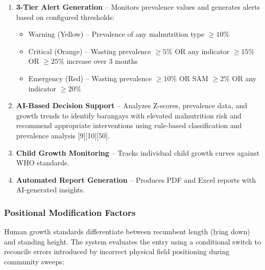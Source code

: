 \documentclass[12pt, a4paper]{report}
\begin{document}
\begin{enumerate}
    \item \textbf{3-Tier Alert Generation} -- Monitors prevalence values and generates alerts based on configured thresholds:
    \begin{itemize}
        \item Warning (Yellow) -- Prevalence of any malnutrition type \(\geq 10\%\)
        \item Critical (Orange) -- Wasting prevalence \(\geq 5\%\) OR any indicator \(\geq 15\%\) OR \(\geq 25\%\) increase over 3 months
        \item Emergency (Red) -- Wasting prevalence \(\geq 10\%\) OR SAM \(\geq 2\%\) OR any indicator \(\geq 20\%\)
    \end{itemize}
    \item \textbf{AI-Based Decision Support} -- Analyzes Z-scores, prevalence data, and growth trends to identify barangays with elevated malnutrition risk and recommend appropriate interventions using rule-based classification and prevalence analysis [9][10][50].
    \item \textbf{Child Growth Monitoring} -- Tracks individual child growth curves against WHO standards.
    \item \textbf{Automated Report Generation} -- Produces PDF and Excel reports with AI-generated insights.
\end{enumerate}

\subsubsection{Positional Modification Factors}
\label{subsubsec:positional}
Human growth standards differentiate between recumbent length (lying down) and standing height. The system evaluates the entry using a conditional switch to reconcile errors introduced by incorrect physical field positioning during community sweeps:
\end{document}
